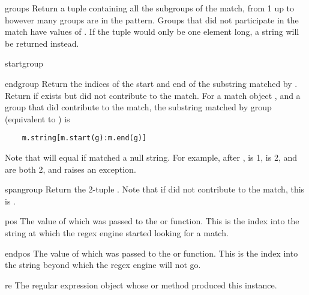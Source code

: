 \begin{funcdesc}{groups}{}
Return a tuple containing all the subgroups of the match, from 1 up to
however many groups are in the pattern.  Groups that did not
participate in the match have values of .  If the tuple
would only be one element long, a string will be returned instead.  
\end{funcdesc}

\begin{funcdesc}{start}{group}
\end{funcdesc}

\begin{funcdesc}{end}{group}
Return the indices of the start and end of the substring
matched by .  Return  if  exists but
did not contribute to the match.  For a match object
, and a group  that did contribute to the match, the
substring matched by group  (equivalent to ) is
\bcode\begin{verbatim}
    m.string[m.start(g):m.end(g)]
\end{verbatim}\ecode
%
Note that
 will equal  if
 matched a null string.  For example, after ,  is 1,  is
2,  and  are both 2, and
 raises an  exception.

\end{funcdesc}

\begin{funcdesc}{span}{group}
Return the 2-tuple .
Note that if  did not contribute to the match, this is
.
\end{funcdesc}

\begin{datadesc}{pos}
The value of  which was passed to the
 or  function.  This is the index into the
string at which the regex engine started looking for a match. 
\end{datadesc}

\begin{datadesc}{endpos}
The value of  which was passed to the
 or  function.  This is the index into the
string beyond which the regex engine will not go.
\end{datadesc}

\begin{datadesc}{re}
The regular expression object whose  or  method
produced this  instance.
\end{datadesc}

